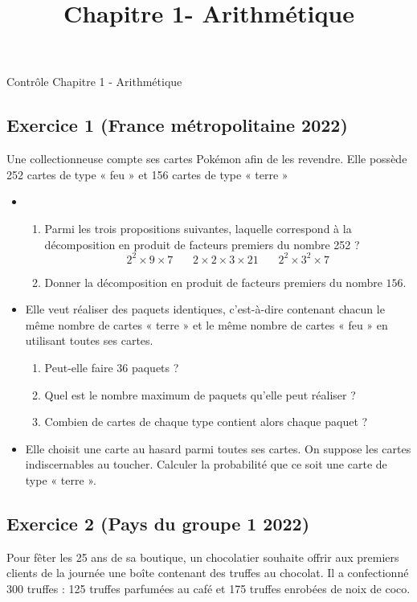 \documentclass[14 pt]{extarticle}
\title{Chapitre 1-  Arithmétique}
\date{}
\theoremstyle{plain}
\begin{document}
\begin{center}{\Large Contrôle Chapitre 1 - Arithmétique}\\ 
 \end{center}
 
 \subsection*{Exercice 1 (France métropolitaine 2022)}
 
 Une collectionneuse compte ses cartes Pokémon afin de les revendre.
Elle possède 252 cartes de type « feu » et 156 cartes de type « terre »
\begin{itemize}
\item[1.]\begin{enumerate}\item Parmi les trois propositions suivantes, laquelle correspond à la décomposition en produit de facteurs premiers du nombre 252 ? 
\[ 2^2 \times 9 \times 7 \ \ \ \ \ \ \ \ 2 \times 2 \times 3
\times 21 \ \ \ \ \ \ \ \ 2^2\times 3^2\times 7\]
\item Donner la décomposition en produit de facteurs premiers du nombre $156$.
\end{enumerate}
\item[2.] Elle veut réaliser des paquets identiques, c’est-à-dire contenant chacun le même nombre
de cartes « terre » et le même nombre de cartes « feu » en utilisant toutes ses cartes.
\begin{enumerate}
\item Peut-elle faire 36 paquets ?
\item  Quel est le nombre maximum de paquets qu’elle peut réaliser ?
\item Combien de cartes de chaque type contient alors chaque paquet ?
\end{enumerate}


\item[3.] Elle choisit une carte au hasard parmi toutes ses cartes. On suppose les cartes indiscernables au toucher.
Calculer la probabilité que ce soit une carte de type « terre ».
\end{itemize}


 \subsection*{Exercice 2 (Pays du groupe 1 2022)}
 

 
 Pour fêter les 25 ans de sa boutique, un chocolatier souhaite offrir aux premiers clients de la journée une
boîte contenant des truffes au chocolat. Il a confectionné 300 truffes : 125 truffes parfumées au café et 175 truffes enrobées de noix de coco. 
\end{document}
